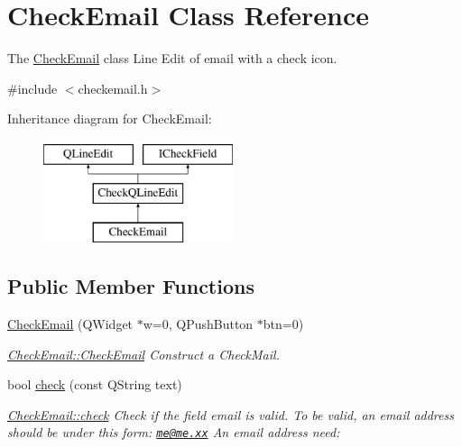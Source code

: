 \hypertarget{classCheckEmail}{\section{Check\+Email Class Reference}
\label{classCheckEmail}
}


The \hyperlink{classCheckEmail}{Check\+Email} class Line Edit of email with a check icon.  




{\ttfamily \#include $<$checkemail.\+h$>$}

Inheritance diagram for Check\+Email\+:\begin{figure}[H]
\begin{center}
\leavevmode
\includegraphics[height=3.000000cm]{da/d1d/classCheckEmail}
\end{center}
\end{figure}
\subsection*{Public Member Functions}
\begin{DoxyCompactItemize}
\item 
\hyperlink{classCheckEmail_a385bd05063deaf42fc02918b9348c8ac}{Check\+Email} (Q\+Widget $\ast$w=0, Q\+Push\+Button $\ast$btn=0)
\begin{DoxyCompactList}\small\item\em \hyperlink{classCheckEmail_a385bd05063deaf42fc02918b9348c8ac}{Check\+Email\+::\+Check\+Email} Construct a Check\+Mail. \end{DoxyCompactList}\item 
bool \hyperlink{classCheckEmail_a544d7656d36bd463391fe2f4dd3e13c6}{check} (const Q\+String text)
\begin{DoxyCompactList}\small\item\em \hyperlink{classCheckEmail_a544d7656d36bd463391fe2f4dd3e13c6}{Check\+Email\+::check} Check if the field email is valid. To be valid, an email address should be under this form\+: \href{mailto:me@me.xx}{\tt me@me.\+xx} An email address need\+: \end{DoxyCompactList}\end{DoxyCompactItemize}
